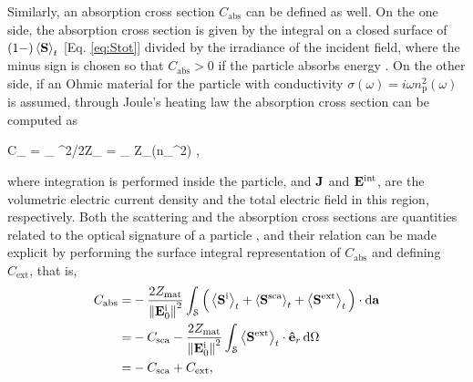 Similarly, an absorption cross section $C_\text{abs}$ can be defined as well. On the one side, the absorption cross section is given by the integral on a closed surface of $(1-)\ev{\vb{S}}_t$  [Eq. \eqref{eq:Stot}] divided by the irradiance of the incident field, where the minus sign is chosen so that $C_\text{abs}>0$ if the particle absorbs energy  \cite{bohren_absorption_1983}. On the other side, if an Ohmic material for the particle with conductivity $\sigma(\omega) = i\omega n_\text{p}^2(\omega)$ \cite{jackson_classical_1999} is assumed, through Joule's heating law \cite{tsang_scattering_2000} the absorption cross section can be computed as
%
%
%
%
%
%
 \begin{tcolorbox}[title = Ohmic Particle - Absorption Cross Section,	ams align, breakable]
 	C_ =	 \int_ 
 									{^2/2Z_}
				= \int_ \omega Z_\Im(n_^2)  ,
 \label{eq:Cabs}
 \end{tcolorbox}%
%
\noindent
where integration is performed inside the particle, and $\vb{J}$  and $\vb{E}^\text{int}$, are the volumetric electric current density and the total electric field in this region, respectively. Both the  scattering and the absorption cross sections are quantities related to the optical signature of a particle \cite{pellarin_forward_2019}, and their relation can be made explicit by performing the surface integral representation of $C_\text{abs}$ and defining $C_\text{ext}$, that is,
%
\begin{align}
C_\text{abs} = & - \frac{2Z_\text{mat}}{\norm{\vb{E}^\text{i}_0}^2}\int_\mathcal{S}
                        \Big(
                                \ev{\vb{S}^\text{i}}_t + \ev{\vb{S}^\text{sca}}_t + \ev{\vb{S}^\text{ext}}_t
                        \Big)\cdot\dd{\vb{a}}
					\notag \\
			=  & - C_\text{sca} - \frac{2Z_\text{mat}}{\norm{\vb{E}_0^\text{i}}^2}\int_\mathcal{S}
                        \ev{\vb{S}^\text{ext}}_t\cdot \vu{e}_r\dd{\Omega}
					\notag \\
			= & -C_\text{sca} + C_\text{ext},
\label{eq:CabsScaInt}
\end{align}
